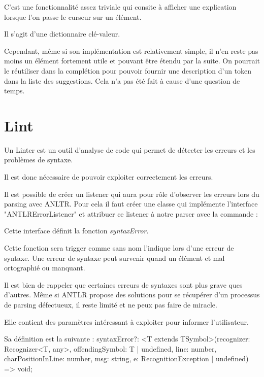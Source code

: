 \documentclass[
    iict, %
    il, %
]{heig-tb}
\begin{document}
C'est une fonctionnalité assez triviale qui consite à afficher une explication lorsque l'on passe le curseur sur un élément.

Il s'agit d'une dictionnaire clé-valeur.

Cependant, même si son implémentation est relativement simple, il n'en reste pas moins un élément fortement utile et pouvant être étendu par la suite.
On pourrait le réutiliser dans la complétion pour pouvoir fournir une description d'un token dans la liste des suggestions.
Cela n'a pas été fait à cause d'une question de temps.





\section{Lint}
Un Linter est un outil d'analyse de code qui permet de détecter les erreurs et les problèmes de syntaxe.

Il est donc nécessaire de pouvoir exploiter correctement les erreurs.

Il est possible de créer un listener qui aura pour rôle d'observer les erreurs lors du parsing avec ANLTR.
Pour cela il faut créer une classe qui implémente l'interface "ANTLRErrorListener" et attribuer ce listener à notre parser
avec la commande :

Cette interface définit la fonction \emph{syntaxError}.

Cette fonction sera trigger comme sans nom l'indique lors d'une erreur de syntaxe.
Une erreur de syntaxe peut survenir quand un élément et mal ortographié ou manquant.

Il est bien de rappeler que certaines erreurs de syntaxes sont plus grave ques d'autres.
Même si ANTLR propose des solutions pour se récupérer d'un processus de parsing défectueux, il reste limité et ne peux pas faire de miracle.

Elle contient des paramètres intéressant à exploiter pour informer l'utilisateur.

Sa définition est la suivante :
syntaxError?: <T extends TSymbol>(recognizer: Recognizer<T, any>, offendingSymbol: T | undefined, line: number, charPositionInLine: number, msg: string, e: RecognitionException | undefined) => void;
\end{document}

